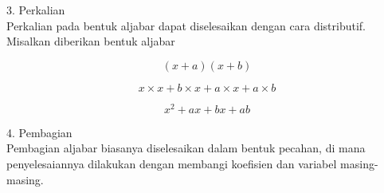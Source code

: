 \documentclass{article}
\begin{document}
\begin{eulernotebook}
\begin{eulercomment}
\begin{eulercomment}
\begin{eulercomment}
\begin{eulercomment}
\begin{eulercomment}
\begin{eulercomment}
\begin{eulercomment}
\begin{eulercomment}
\begin{eulercomment}
\begin{eulercomment}
\begin{eulercomment}
3. Perkalian\\
Perkalian pada bentuk aljabar dapat diselesaikan dengan cara
distributif.\\
Misalkan diberikan bentuk aljabar\\
\end{eulercomment}
\begin{eulerformula}
\[
(x+a)(x+b)
\]
\end{eulerformula}
\begin{eulerformula}
\[
x\times x+b\times x+a\times x+a\times b
\]
\end{eulerformula}
\begin{eulerformula}
\[
x^2+ax+bx+ab
\]
\end{eulerformula}
\begin{eulercomment}
4. Pembagian\\
Pembagian aljabar biasanya diselesaikan dalam bentuk pecahan, di mana
penyelesaiannya dilakukan dengan membangi koefisien dan variabel
masing-masing.


\end{eulercomment}
\end{eulercomment}
\end{eulercomment}
\end{eulercomment}
\end{eulercomment}
\end{eulercomment}
\end{eulercomment}
\end{eulercomment}
\end{eulercomment}
\end{eulercomment}
\end{eulercomment}
\end{eulernotebook}
\end{document}

